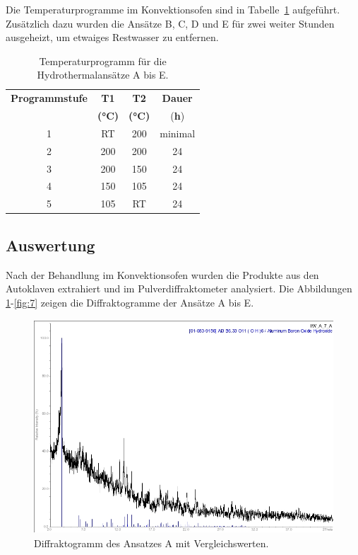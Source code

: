 \documentclass[12pt]{article}
\begin{document}
\noindent Die Temperaturprogramme im Konvektionsofen sind in Tabelle~\ref{tab:8} aufgeführt. Zusätzlich dazu wurden die Ansätze B, C, D und E für zwei weiter Stunden ausgeheizt, um etwaiges Restwasser zu entfernen.

\begin{table}[H]
    \centering
    \caption{Temperaturprogramm für die Hydrothermalansätze A bis E.}
    \begin{tabular}{|c|c|c|c|}
        \hline
        \textbf{Programmstufe} & \textbf{T1} & \textbf{T2} & \textbf{Dauer} \\
        & \textbf{(\si{\degreeCelsius})} & \textbf{(\si{\degreeCelsius})} & (\textbf{h})  \\
        \hline
        1 & RT& 200 & minimal \\
        2 & 200 & 200 & 24 \\
        3 & 200 & 150 & 24 \\
        4 & 150 & 105 &  24\\
        5 & 105 & RT & 24 \\
        \hline
    \end{tabular}
    \label{tab:8}
\end{table}

\subsection{Auswertung}
Nach der Behandlung im Konvektionsofen wurden die Produkte aus den Autoklaven extrahiert und im Pulverdiffraktometer analysiert.
Die Abbildungen \ref{fig:3}-\ref{fig:7} zeigen die Diffraktogramme der Ansätze A bis E.

\begin{figure}[H]
    \centering
    \includegraphics[height=8cm]{Images/AutoklaveA.jpeg}
    \caption{Diffraktogramm des Ansatzes A mit Vergleichswerten.}
    \label{fig:3}
\end{figure}
\end{document}
